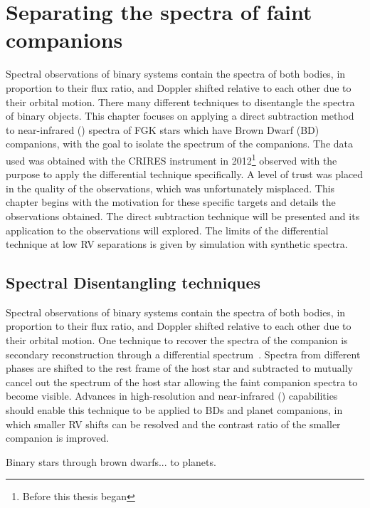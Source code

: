 
\chapter{Separating the spectra of faint companions} %
\label{cha:direct_recovery}

Spectral observations of binary systems contain the spectra of both bodies, in proportion to their flux ratio, and Doppler shifted relative to each other due to their orbital motion.
There many different techniques to disentangle the spectra of binary objects.
This chapter focuses on applying a direct subtraction method to near-infrared (\nir{}) spectra of {FGK} stars which have Brown Dwarf (BD) companions, with the goal to isolate the spectrum of the companions.
The data used was obtained with the {CRIRES} instrument in 2012\footnote{Before this thesis began} observed with the purpose to apply the differential technique specifically.
A level of trust was placed in the quality of the observations, which was unfortunately misplaced.
This chapter begins with the motivation for these specific targets and details the observations obtained.
The direct subtraction technique will be presented and its application to the observations will explored.
The limits of the differential technique at low RV separations is given by simulation with synthetic spectra.


\section{Spectral Disentangling techniques}
\todo{}

Spectral observations of binary systems contain the spectra of both bodies, in proportion to their flux ratio, and Doppler shifted relative to each other due to their orbital motion.
One technique to recover the spectra of the companion is secondary reconstruction through a differential spectrum~\citep{ferluga_separating_1997}.
Spectra from different phases are shifted to the rest frame of the host star and subtracted to mutually cancel out the spectrum of the host star allowing the faint companion spectra to become visible.
Advances in high-resolution and near-infrared (\nir{}) capabilities should enable this technique to be applied to BDs and planet companions, in which smaller {RV} shifts can be resolved and the contrast ratio of the smaller companion is improved.


Binary stars through brown dwarfs...
to planets.



